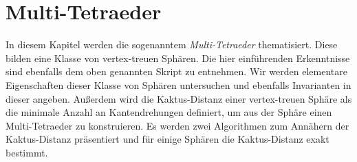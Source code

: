 \documentclass[12pt,titlepage,twoside,cleardoublepage]{article}
\theoremstyle{nummermitklammern}
\numberwithin{equation}{section}
\begin{document}
\section{Multi-Tetraeder}\label{kapitelmultitetraeder}
In diesem Kapitel werden die sogenanntem \emph{Multi-Tetraeder} thematisiert. Diese bilden eine Klasse von vertex-treuen Sphären. Die hier einführenden Erkenntnisse sind ebenfalls dem oben genannten Skript zu entnehmen. Wir werden elementare Eigenschaften dieser Klasse von Sphären untersuchen und ebenfalls Invarianten in dieser angeben. Außerdem wird die Kaktus-Distanz einer vertex-treuen Sphäre als die minimale Anzahl an Kantendrehungen definiert, um aus der Sphäre einen Multi-Tetraeder zu konstruieren. Es werden zwei Algorithmen zum Annähern der Kaktus-Distanz präsentiert und für einige Sphären die Kaktus-Distanz exakt bestimmt.
\end{document}
